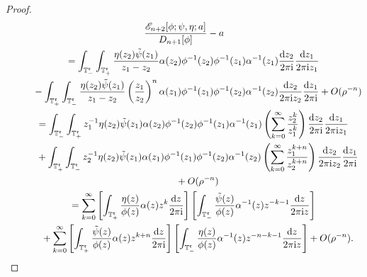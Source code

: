 \documentclass[pdftex]{sigma}
\numberwithin{equation}{section}
\newcommand{\T}{{\mathbb T}}
\newcommand{\al}{\alpha}
\newcommand{\ii}{{\rm i}}
\newcommand{\dd}{{\rm d}}
\begin{document}
\begin{proof}
			\begin{gather}
					\frac{\mathscr{E}_{n+2}[\phi;\psi, \eta ;a]}{D_{n+1}[\phi]} - a\nonumber\\
\qquad = \int_{\T^{\mathfrak{r}}_{-}} \int_{\T^{\mathfrak{r}}_{+}} \frac{\eta(z_2) \Tilde{\psi}(z_1)}{z_1-z_2} \al(z_2) \phi^{-1}(z_2) \phi^{-1}(z_1) \al^{-1}(z_1) \frac{\dd z_2}{2 \pi \ii } \frac{\dd z_1}{2 \pi \ii z_1}\nonumber \\
\phantom{\qquad =}{} - \int_{\T^{\mathfrak{r}}_{+}} \int_{\T^{\mathfrak{r}}_{-}} \frac{\eta(z_2) \Tilde{\psi}(z_1)}{z_1-z_2} \left( \frac{z_1}{z_2} \right)^n \al(z_1) \phi^{-1}(z_1) \phi^{-1}(z_2) \al^{-1}(z_2) \frac{\dd z_2}{2 \pi \ii z_2} \frac{\dd z_1}{2 \pi \ii } + O(\rho^{-n}) \nonumber\\
\qquad = \int_{\T^{\mathfrak{r}}_{-}} \int_{\T^{\mathfrak{r}}_{+}} z^{-1}_1\eta(z_2) \Tilde{\psi}(z_1) \al(z_2) \phi^{-1}(z_2) \phi^{-1}(z_1) \al^{-1}(z_1) \left( \sum_{k=0}^{\infty} \frac{z^k_2}{z^k_1} \right) \frac{\dd z_2}{2 \pi \ii } \frac{\dd z_1}{2 \pi \ii z_1} \nonumber\\
\phantom{\qquad =}{} + \int_{\T^{\mathfrak{r}}_{+}} \int_{\T^{\mathfrak{r}}_{-}} z^{-1}_2\eta(z_2) \Tilde{\psi}(z_1) \al(z_1) \phi^{-1}(z_1) \phi^{-1}(z_2) \al^{-1}(z_2) \left( \sum_{k=0}^{\infty} \frac{z^{k+n}_1}{z^{k+n}_2} \right) \frac{\dd z_2}{2 \pi \ii z_2} \frac{\dd z_1}{2 \pi \ii }\nonumber \\
\phantom{\qquad =}{} + O(\rho^{-n}) \nonumber\\
\qquad = \sum_{k=0}^{\infty} \left[ \int_{\T^{\mathfrak{r}}_{+}} \frac{\eta(z)}{\phi(z)} \al(z) z^k \frac{\dd z}{2 \pi \ii} \right] \left[ \int_{\T^{\mathfrak{r}}_{-}} \frac{\Tilde{\psi}(z)}{\phi(z)} \al^{-1}(z) z^{-k-1} \frac{\dd z}{2 \pi \ii z} \right] \nonumber\\
\phantom{\qquad =}{} + \sum_{k=0}^{\infty} \left[ \int_{\T^{\mathfrak{r}}_{+}} \frac{\Tilde{\psi}(z)}{\phi(z)} \al(z) z^{k+n} \frac{\dd z}{2 \pi \ii} \right] \left[ \int_{\T^{\mathfrak{r}}_{-}} \frac{\eta(z)}{\phi(z)} \al^{-1}(z) z^{-n-k-1} \frac{\dd z}{2 \pi \ii z} \right] + O(\rho^{-n}).\label{3.61 a}
			\end{gather}
			

\end{proof}
\end{document}
